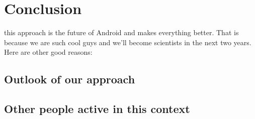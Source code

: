 \section{Conclusion}

 this approach is the future of Android and makes everything better. That is because we are such cool guys and we'll become scientists in the next two years. Here are other good reasons:

	\subsection{Outlook of our approach}
	
	\subsection{Other people active in this context}